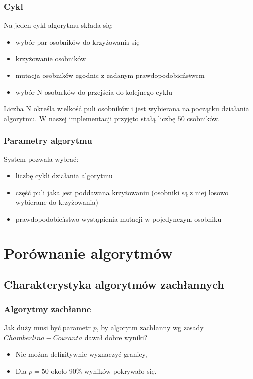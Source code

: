 \documentclass{beamer}
\begin{document}

\begin{frame}
\frametitle{Cykl}

Na jeden cykl algorytmu składa się:

\begin{itemize}
\item wybór par osobników do krzyżowania się
\item krzyżowanie osobników
\item mutacja osobników zgodnie z zadanym prawdopodobieństwem
\item wybór N osobników do przejścia do kolejnego cyklu
\end{itemize}

Liczba N określa wielkość puli osobników i jest wybierana na początku działania algorytmu. W naszej implementacji przyjęto stałą liczbę $50$ osobników.

\end{frame}


\begin{frame}
\frametitle{Parametry algorytmu}

System pozwala wybrać:
\begin{itemize}
\item liczbę cykli działania algorytmu
\item część puli jaka jest poddawana krzyżowaniu (osobniki są z niej losowo wybierane do krzyżowania)
\item prawdopodobieństwo wystąpienia mutacji w pojedynczym osobniku
\end{itemize}
\end{frame}


\section{Porównanie algorytmów}

\subsection{Charakterystyka algorytmów zachłannych}

\begin{frame}
\frametitle{Algorytmy zachłanne}

Jak duży musi być parametr $p$, by algorytm zachłanny wg zasady $Chamberlina - Couranta$ dawał dobre wyniki?

\begin{itemize}
\item Nie można definitywnie wyznaczyć granicy,
\item Dla $p = 50$ około 90\% wyników pokrywało się.
\end{itemize}

\end{frame}
\end{document}
